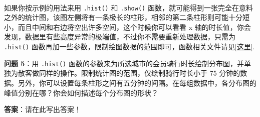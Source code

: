 \documentclass[11pt]{article}
\begin{document}
    \begin{center}
    \end{center}
    { \hspace*{\fill} \\}
    
    如果你按示例的用法来用 \texttt{.hist()} 和 \texttt{.show()}
函数，就可能得到一张完全在意料之外的统计图，该图左侧将有一条极长的柱形，相邻的第二条柱形则可能十分短小，而且中间和右边将空出许多空间，这个时候你可以看看
x
轴的时长值，你会发现，数据里有些高度异常的极端值，不过你不需要重新处理数据，只需为
\texttt{.hist()}
函数再加一些参数，限制绘图数据的范围即可，函数相关文件请见\href{https://matplotlib.org/devdocs/api/_as_gen/matplotlib.pyplot.hist.html\#matplotlib.pyplot.hist}{{[}这里{]}}.

\textbf{问题 5}：用 \texttt{.hist()}
函数的参数来为所选城市的会员骑行时长绘制分布图，并单独为散客做同样的操作。限制统计图的范围，仅绘制骑行时长小于
75
分钟的数据。另外，你可以设置每条柱形之间有五分钟的间隔。在每组数据中，各分布图的峰值分别在哪？你会如何描述每个分布图的形状？

\textbf{答案}：请在此写出答案！
\end{document}
